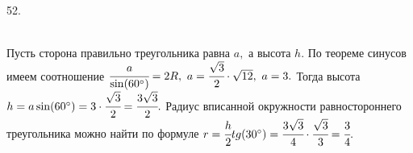 52. \begin{figure}[ht!]
\end{figure}\\
Пусть сторона правильно треугольника равна $a,$ а высота $h.$ По теореме синусов имеем соотношение $\cfrac{a}{\sin(60^\circ)}=2R,\ a=\cfrac{\sqrt{3}}{2}\cdot\sqrt{12},\ a=3.$ Тогда высота $h=a\sin(60^\circ)=3\cdot\cfrac{\sqrt{3}}{2}=\cfrac{3\sqrt{3}}{2}.$ Радиус вписанной окружности равностороннего треугольника можно найти по формуле $r=\cfrac{h}{2}tg(30^\circ)=\cfrac{3\sqrt{3}}{4}\cdot\cfrac{\sqrt{3}}{3}=\cfrac{3}{4}.$\\

